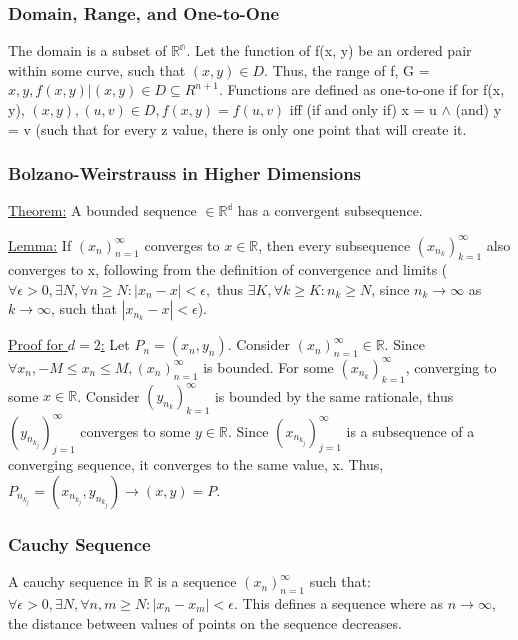 \documentclass[11 pt, twoside]{article}
\begin{document}
\subsubsection{Domain, Range, and One-to-One}
The domain is a subset of $\mathbb{R^n}$.
Let the function of f(x, y) be an ordered pair within some curve, such that $(x, y) \in D$. Thus, the range of f, G = ${x, y, f(x,y) | (x, y) \in D} \subseteq{R^{n+1}}$.
Functions are defined as one-to-one if for f(x, y), $(x, y), (u, v) \in D, f(x, y) = f(u, v)$ iff (if and only if) x = u $\wedge$ (and) y = v (such that for every z value, there is only one point that will create it.

\subsubsection{Bolzano-Weirstrauss in Higher Dimensions}
\underline{Theorem:} A bounded sequence $\in \mathbb{R^d}$ has a convergent subsequence.

\underline{Lemma:} If $(x_n)_{n=1}^\infty$ converges to $x \in \mathbb{R}$, then every subsequence $(x_{n_k})_{k=1}^\infty$ also converges to x, following from the definition of convergence and limits ($\forall \epsilon > 0, \exists N, \forall n \geq N: |x_n - x| < \epsilon,$ thus $\exists K, \forall k \geq K: n_k \geq N$, since $n_k \to \infty$ as $k \to \infty$, such that $|x_{n_k} - x| < \epsilon$).

\underline{Proof for $d = 2$:} Let $P_n = (x_n, y_n)$. Consider $(x_n)_{n=1}^\infty \in \mathbb{R}$. Since $\forall x_n, -M \leq x_n \leq M, (x_n)_{n=1}^\infty$ is bounded. For some $(x_{n_k})_{k=1}^\infty$, converging to some $x \in \mathbb{R}$. Consider $(y_{n_k})_{k=1}^\infty$ is bounded by the same rationale, thus $(y_{n_{k_j}})^\infty_{j=1}$ converges to some $y \in \mathbb{R}$. Since $(x_{n_{k_j}})_{j=1}^\infty$ is a subsequence of a converging sequence, it converges to the same value, x. Thus, $P_{n_{k_j}} = (x_{n_{k_j}}, y_{n_{k_j}}) \to (x, y) = P$.

\subsubsection{Cauchy Sequence}
A cauchy sequence in $\mathbb{R}$ is a sequence $(x_n)^\infty_{n=1}$ such that: $\forall \epsilon > 0, \exists N, \forall n, m \geq N: |x_n - x_m| < \epsilon$. This defines a sequence where as $n \to \infty$, the distance between values of points on the sequence decreases.
\end{document}
